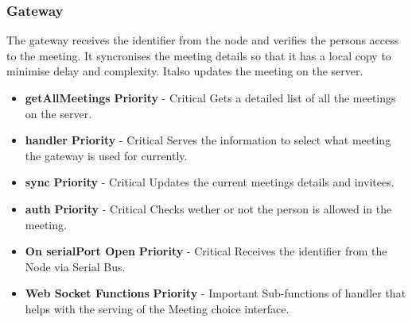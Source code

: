\documentclass{article}
\begin{document}
		\subsubsection{Gateway} The gateway receives the identifier from the node and verifies the persons access to the meeting. It syncronises the meeting details so that it has a local copy to minimise delay and complexity. Italso updates the meeting on the server.
		\begin{itemize}
			\item \textbf{getAllMeetings}
				\newline\textbf{ Priority } - Critical
				\newline Gets a detailed list of all the meetings on the server.
			\item \textbf{handler}
				\newline\textbf{ Priority } - Critical
				\newline Serves the information to select what meeting the gateway is used for currently.
			\item \textbf{sync}
				\newline\textbf{ Priority } - Critical
				\newline Updates the current meetings details and invitees.
			\item \textbf{auth}
				\newline\textbf{ Priority } - Critical
				\newline Checks wether or not the person is allowed in the meeting.
			\item \textbf{On serialPort Open}
				\newline\textbf{ Priority } - Critical
				\newline Receives the identifier from the Node via Serial Bus.
			\item \textbf{Web Socket Functions}
				\newline\textbf{ Priority } - Important
				\newline Sub-functions of handler that helps with the serving of the Meeting choice interface.
			

		\end{itemize}



\newpage
		
\end{document}
